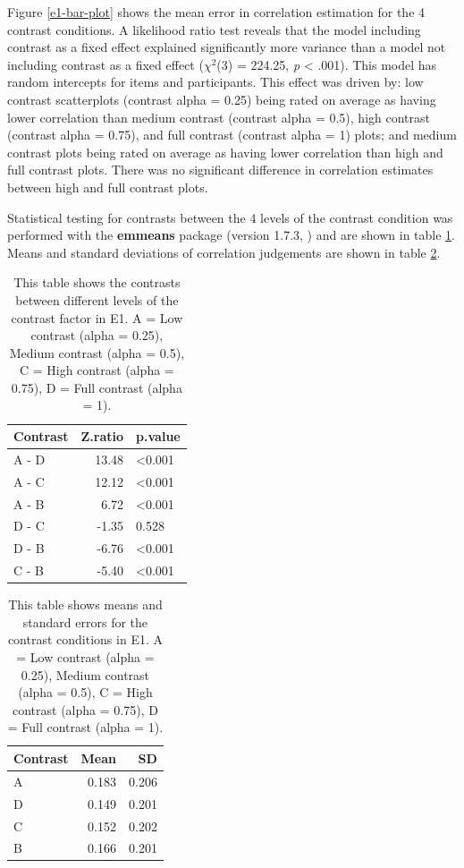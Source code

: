 \documentclass[preprint, 3p,
authoryear]{elsarticle} %
\begin{document}
Figure \ref{e1-bar-plot} shows the mean error in correlation estimation
for the 4 contrast conditions. A likelihood ratio test reveals that the
model including contrast as a fixed effect explained significantly more
variance than a model not including contrast as a fixed effect
(\(\chi^2\)(3) = 224.25, \emph{p} \textless{} .001). This model has
random intercepts for items and participants. This effect was driven by:
low contrast scatterplots (contrast alpha = 0.25) being rated on average
as having lower correlation than medium contrast (contrast alpha = 0.5),
high contrast (contrast alpha = 0.75), and full contrast (contrast alpha
= 1) plots; and medium contrast plots being rated on average as having
lower correlation than high and full contrast plots. There was no
significant difference in correlation estimates between high and full
contrast plots.

Statistical testing for contrasts between the 4 levels of the contrast
condition was performed with the \textbf{emmeans} package (version
1.7.3, \citep{emmeans}) and are shown in table \ref{contrasts-table-e1}.
Means and standard deviations of correlation judgements are shown in
table \ref{sum-stats-e1}.

\begin{table}

\caption{\label{tab:contrasts-table-e1}\label{contrasts-table-e1}This table shows the contrasts between different levels of the contrast factor in E1. A = Low contrast (alpha = 0.25), Medium contrast (alpha = 0.5), C = High contrast (alpha = 0.75), D = Full contrast (alpha = 1).}
\centering
\begin{tabular}[t]{lrl}
\toprule
Contrast & Z.ratio & p.value\\
\midrule
A - D & 13.48 & <0.001\\
A - C & 12.12 & <0.001\\
A - B & 6.72 & <0.001\\
D - C & -1.35 & 0.528\\
D - B & -6.76 & <0.001\\
\addlinespace
C - B & -5.40 & <0.001\\
\bottomrule
\end{tabular}
\end{table}

\begin{table}

\caption{\label{tab:sum-stats-e1}\label{sum-stats-e1}This table shows means and standard errors for the contrast conditions in E1. A = Low contrast (alpha = 0.25), Medium contrast (alpha = 0.5), C = High contrast (alpha = 0.75), D = Full contrast (alpha = 1).}
\centering
\begin{tabular}[t]{lrr}
\toprule
Contrast & Mean & SD\\
\midrule
A & 0.183 & 0.206\\
D & 0.149 & 0.201\\
C & 0.152 & 0.202\\
B & 0.166 & 0.201\\
\bottomrule
\end{tabular}
\end{table}
\end{document}
